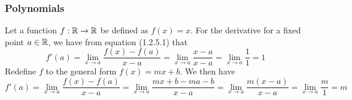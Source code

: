 \subsubsection{Polynomials}
Let a function \(f : \mathbb{R} \to \mathbb{R}\) be defined as \(f(x) = x\). For the derivative for a fixed point \(a \in \mathbb{R}\), we have from equation (1.2.5.1) that
\begin{equation}
    f'(a) = \lim_{x \to a} \frac{f(x) - f(a)}{x - a} = \lim_{x \to a} \frac{x - a}{x - a} = \lim_{x \to a} \frac{1}{1} = 1
\end{equation}
Redefine \(f\) to the general form \(f(x) = mx + b\). We then have
\begin{equation}
    f'(a) = \lim_{x \to a} \frac{f(x) - f(a)}{x - a} = \lim_{x \to a} \frac{mx + b - ma - b}{x - a} = \lim_{x \to a} \frac{m(x - a)}{x - a} = \lim_{x\to a} \frac{m}{1} = m
\end{equation}